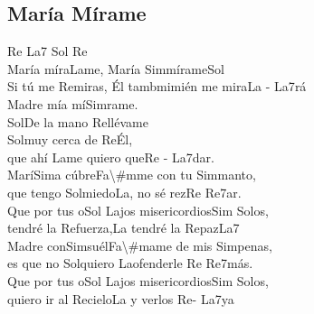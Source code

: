 \subsection{María Mírame}

\begin{center}

{\Large 
\ac{Re} \quad \ac{La7} \quad \ac{Sol} \quad \ac{Re}\quad \\
María míra\ac{La}me, María \ac{Sim}mírame\ac{Sol}\\
Si tú me \ac{Re}miras, Él tamb\ac{mim}ién me mira\ac{La - La7}rá\\
Madre mía mí\ac{Sim}rame.\\
\ac{Sol}De la mano \ac{Re}llévame\\
\ac{Sol}muy cerca de \ac{Re}Él,\\
que ahí \ac{La}me quiero que\ac{Re - La7}dar.\\
\vspace{1ex}
Marí\ac{Sim}a cúbre\ac{Fa\#m}me con tu \ac{Sim}manto,\\
que tengo \ac{Sol}miedo\ac{La}, no sé rez\ac{Re   Re7}ar.\\
Que por tus o\ac{Sol La}jos misericordios\ac{Sim Sol}os,\\
tendré la \ac{Re}fuerza,\ac{La} tendré la \ac{Re}paz\ac{La7}\\
\vspace{1ex}
Madre con\ac{Sim}suél\ac{Fa\#m}ame de mis \ac{Sim}penas,\\
es que no \ac{Sol}quiero \ac{La}ofenderle \ac{Re   Re7}más.\\
Que por tus o\ac{Sol La}jos misericordios\ac{Sim Sol}os,\\
quiero ir al \ac{Re}cielo\ac{La} y verlos \ac{Re- La7}ya\\
}
\end{center}